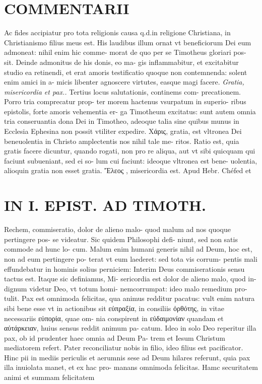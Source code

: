 \documentclass{article}
\begin{document}
\begin{pages}
\section*{COMMENTARII }\pstart Ac fides accipiatur pro tota religionis causa q.d.in religione Christiana, in Christianismo filius meus est.  \pend\pstart His laudibus illum ornat vt beneficiorum Dei eum admoneat: nihil enim hic comme- morat de quo per se Timotheus gloriari pos- sit. Deinde admonitus de his donis, eo ma- gis inflammabitur, et excitabitur studio ea retinendi, et erat amoris testificatio quoque non contemnenda: solent enim amici in a- micis libenter agnoscere virtutes, easque magi facere.  \pend
\textit{Gratia, misericordia et pax.. }\pstart Tertius locus salutationis, continems com- precationem. Porro tria comprecatur prop- ter morem hactenus vsurpatum in superio- ribus epistolis, forte amoris vehementia er- ga Timotheum excitatus: sunt autem omnia tria conseruantia dona Dei in Timotheo, adeoque talia sine quibus munus in Ecclesia Ephesina non possit vtiliter expedire.  \pend\pstart Xάρις, gratia, est vltronea Dei beneuolentia in Christo amplectentis nos nihil tale me- ritos. Ratio est, quia gratis facere dicuntur, quando rogati, non pro re aliqua, aut vt sibi quicquam qui faciunt subueniant, sed ei so- lum cui faciunt: ideoque vltronea est bene- uolentia, alioquin gratia non esset gratia. Ἔλεος , misericordia est. Apud Hebr. Chéfed et  \pend
\section*{IN I. EPIST. AD TIMOTH. }
\marginpar{[ p.15 ]}\pstart Rechem, commiseratio, dolor de alieno malo- quod malum ad nos quoque pertingere pos- se videatur. Sic quidem Philosophi defi- niunt, sed non satis commode ad hunc lo- cum. Malum enim humani generis nihil ad Deum, hoc est, non ad eum pertingere po- terat vt eum laederet: sed tota vis corrum- pentis mali effundebatur in hominis solius perniciem: Interim Deus commiserationis sensu tactus est. Itaque sic definiamus, Mi- sericordia est dolor de alieno malo, quod in- dignum videtur Deo, vt totum homi- nemcorrumpat: ideo malo remedium pro- tulit.  \pend\pstart Pax est omnimoda felicitas, qua animus redditur pacatus: vult enim natura sibi bene esse vt in actionibus sit εὐπραξία, in consiliis ὀρθότης, in vitae necessariis εὐπορία, quae om- nia conspirent in εὐδαιμονίαν quandam et αὐτάρκειαν, huius sensus reddit animum pa- catum. Ideo in solo Deo reperitur illa pax, ob id prudenter haec omnia ad Deum Pa- trem et Iesum Christum mediatorem refert. Pater reconciliatur nobis in filio, ideo filius est pacificator. Hinc pii in mediis periculis et aerumnis sese ad Deum hilares referunt, quia pax illa inuiolata manet, et ex hac pro- manans omnimoda felicitas.  \pend\pstart Hamc securitatem animi et summam felicitatem  \pend
\marginpar{[ p.16 ]}

\end{pages}
\end{document}
